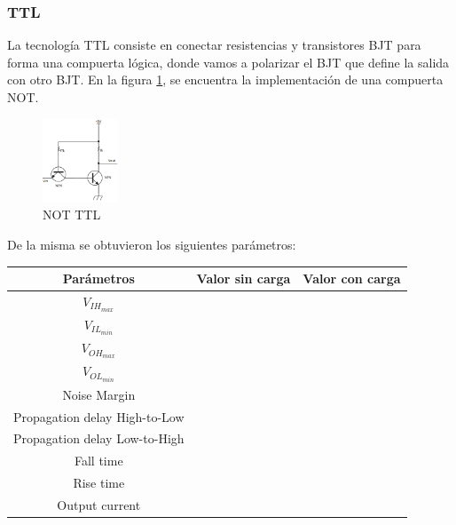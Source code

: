 \subsubsection{TTL}
La tecnología TTL consiste en conectar resistencias y transistores BJT para forma una compuerta lógica, donde vamos a polarizar el BJT que define la salida con otro BJT. En la figura \ref{fig:eje1_2}, se encuentra la implementación de una compuerta NOT.
\begin{figure}[H]
	\centering
	\includegraphics[width=0.2\textwidth]{Ejercicio1/TTL.png}
	\caption{NOT TTL}
	\label{fig:eje1_2}
\end{figure}
De la misma se obtuvieron los siguientes parámetros:
\begin{table}[H]
	\centering
	\begin{tabular}{|c|c|c|}
		\hline
		Parámetros & Valor sin carga & Valor con carga\\
		\hline
		$V_{IH_{max}}$ & & \\
		\hline
		$V_{IL_{min}}$ & & \\
		\hline
		$V_{OH_{max}}$ & & \\
		\hline
		$V_{OL_{min}}$ & & \\
		\hline
		Noise Margin & & \\
		\hline
		Propagation delay High-to-Low & & \\
		\hline
		Propagation delay Low-to-High & & \\
		\hline
		Fall time & & \\
		\hline
		Rise time & & \\
		\hline
		Output current & & \\
		\hline
	\end{tabular}
\end{table}

